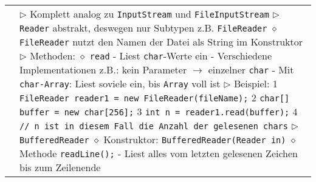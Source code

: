 \begin{longtable}{ | p{} p{} | }
	\makecell[l]{Textdaten lesen} & \makecell[l]{
	$\triangleright$ Komplett analog zu \texttt{InputStream} und \texttt{FileInputStream} \\
	$\triangleright$ \texttt{Reader} abstrakt, deswegen nur Subtypen z.B. \texttt{FileReader} \\
	\hspace{0.4cm} $\diamond$ \texttt{FileReader} nutzt den Namen der Datei als String im Konstruktor \\
	$\triangleright$ Methoden: \\
	\hspace{0.4cm} $\diamond$ \texttt{read} \\
	\hspace{0.6cm} - Liest \texttt{char}-Werte ein \\
	\hspace{0.6cm} - Verschiedene Implementationen z.B.: kein Parameter $\rightarrow$ einzelner \texttt{char} \\
	\hspace{0.6cm} - Mit \texttt{char-Array}: Liest soviele ein, bis \texttt{Array} voll ist \\
	$\triangleright$ Beispiel: \\
	\hspace{0.4cm} 1 \hspace{0.1cm} \texttt{FileReader reader1 = new FileReader(fileName);} \\
	\hspace{0.4cm} 2 \hspace{0.1cm} \texttt{char[] buffer = new char[256];} \\
	\hspace{0.4cm} 3 \hspace{0.1cm} \texttt{int n = reader1.read(buffer);} \\
	\hspace{0.4cm} 4 \hspace{0.1cm} \texttt{// n ist in diesem Fall die Anzahl der gelesenen chars} \\
	$\triangleright$ \texttt{BufferedReader} \\
	\hspace{0.4cm} $\diamond$ Konstruktor: \texttt{BufferedReader(Reader in)} \\
	\hspace{0.4cm} $\diamond$ Methode \texttt{readLine();} \\
	\hspace{0.6cm} - Liest alles vom letzten gelesenen Zeichen bis zum Zeilenende \\
}
\end{longtable}
